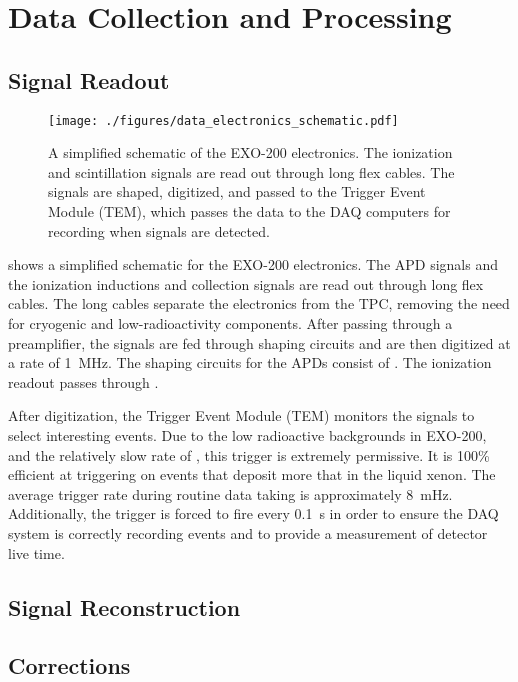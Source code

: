 \documentclass[herrin-thesis.tex]{subfiles}
\begin{document}
\chapter{Data Collection and Processing}
\label{ch:data}

\section{Signal Readout}
\begin{figure}
\centering
\texttt{[image: ./figures/data\_electronics\_schematic.pdf]}
\caption[The EXO-200 electronics]{A simplified schematic of the EXO-200 electronics. The ionization and scintillation signals are read out through long flex cables. The signals are shaped, digitized, and passed to the Trigger Event Module (TEM), which passes the data to the DAQ computers for recording when signals are detected.}
\label{fig:data_electronics_schematic}
\end{figure}

 shows a simplified schematic for the EXO-200 electronics. The APD signals and the ionization inductions and collection signals are read out through long flex cables. The long cables separate the electronics from the TPC, removing the need for cryogenic and low-radioactivity components. After passing through a preamplifier, the signals are fed through shaping circuits and are then digitized at a rate of \SI{1}{\MHz}. The shaping circuits for the APDs consist of . The ionization readout passes through .

After digitization, the Trigger Event Module (TEM) monitors the signals to select interesting events. Due to the low radioactive backgrounds in EXO-200, and the relatively slow rate of \twonu, this trigger is extremely permissive. It is 100\% efficient at triggering on events that deposit more that  in the liquid xenon. The average trigger rate during routine data taking is approximately \SI{8}{\mHz}. Additionally, the trigger is forced to fire every \SI{0.1}{\s} in order to ensure the DAQ system is correctly recording events and to provide a measurement of detector live time.

\section{Signal Reconstruction}

\section{Corrections}
\end{document}

